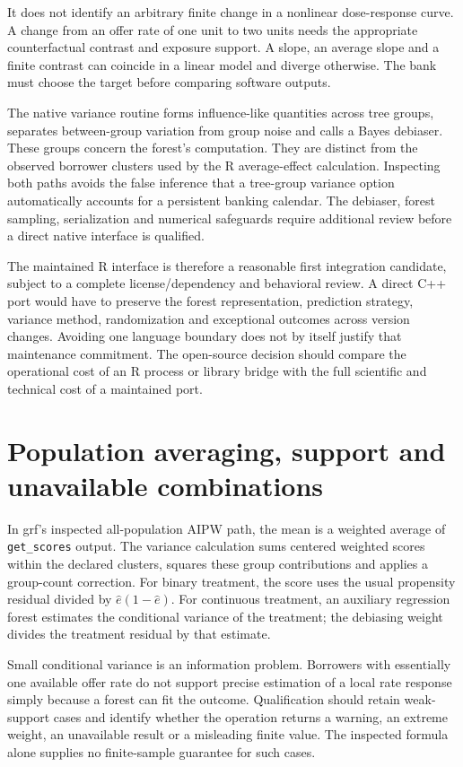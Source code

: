 It does not identify an arbitrary finite change in a nonlinear dose-response
curve. A change from an offer rate of one unit to two units needs the appropriate
counterfactual contrast and exposure support. A slope, an average slope and a
finite contrast can coincide in a linear model and diverge otherwise. The bank
must choose the target before comparing software outputs.

The native variance routine forms influence-like quantities across tree
groups, separates between-group variation from group noise and calls a Bayes
debiaser. These groups concern the forest's computation. They are distinct
from the observed borrower clusters used by the R average-effect calculation.
Inspecting both paths avoids the false inference that a tree-group variance
option automatically accounts for a persistent banking calendar. The debiaser,
forest sampling, serialization and numerical safeguards require additional
review before a direct native interface is qualified.\cite{v131_sw_grf}

The maintained R interface is therefore a reasonable first integration
candidate, subject to a complete license/dependency and behavioral review.
A direct C++ port would have to preserve the forest representation, prediction
strategy, variance method, randomization and exceptional outcomes across version
changes. Avoiding one language boundary does not by itself justify that
maintenance commitment. The open-source decision should compare the operational
cost of an R process or library bridge with the full scientific and technical
cost of a maintained port.

\section{Population averaging, support and unavailable combinations}

In grf's inspected all-population AIPW path, the mean is a weighted average of
\texttt{get\_scores} output. The variance calculation sums centered weighted
scores within the declared clusters, squares these group contributions and
applies a group-count correction. For binary treatment, the score uses the
usual propensity residual divided by $\widehat e(1-\widehat e)$. For continuous
treatment, an auxiliary regression forest estimates the conditional variance
of the treatment; the debiasing weight divides the treatment residual by that
estimate.\cite{v131_sw_grf}

Small conditional variance is an information problem. Borrowers with essentially
one available offer rate do not support precise estimation of a local rate
response simply because a forest can fit the outcome. Qualification should
retain weak-support cases and identify whether the operation returns a
warning, an extreme weight, an unavailable result or a misleading finite value.
The inspected formula alone supplies no finite-sample guarantee for such cases.

